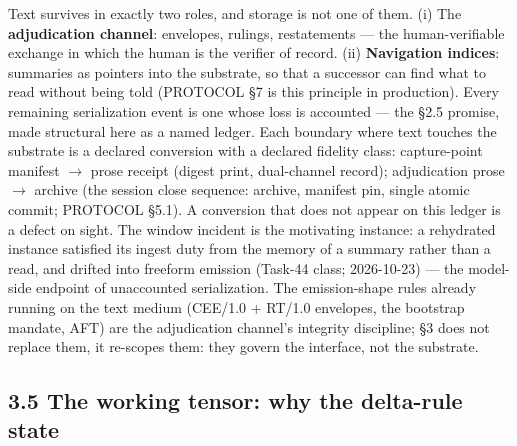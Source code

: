 \documentclass[11pt]{article}
\begin{document}
Text survives in exactly two roles, and storage is not one of them. (i) The \textbf{adjudication channel}: envelopes, rulings, restatements --- the human-verifiable exchange in which the human is the verifier of record. (ii) \textbf{Navigation indices}: summaries as pointers into the substrate, so that a successor can find what to read without being told (PROTOCOL \S{}7 is this principle in production). Every remaining serialization event is one whose loss is accounted --- the \S{}2.5 promise, made structural here as a named ledger. Each boundary where text touches the substrate is a declared conversion with a declared fidelity class: capture-point manifest \(\to\) prose receipt (digest print, dual-channel record); adjudication prose \(\to\) archive (the session close sequence: archive, manifest pin, single atomic commit; PROTOCOL \S{}5.1). A conversion that does not appear on this ledger is a defect on sight. The window incident is the motivating instance: a rehydrated instance satisfied its ingest duty from the memory of a summary rather than a read, and drifted into freeform emission (Task-44 class; 2026-10-23) --- the model-side endpoint of unaccounted serialization. The emission-shape rules already running on the text medium (CEE/1.0 + RT/1.0 envelopes, the bootstrap mandate, AFT) are the adjudication channel's integrity discipline; \S{}3 does not replace them, it re-scopes them: they govern the interface, not the substrate.

\subsection{3.5 The working tensor: why the delta-rule state}\label{the-working-tensor-why-the-delta-rule-state}
\end{document}
